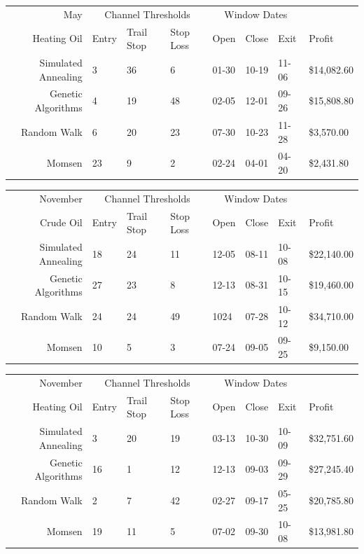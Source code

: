 \documentclass[12pt]{article}
\begin{document}
\begin{tabular}{|r|l|l|l|l|l|l|l|}
  \hline
  May & \multicolumn{3}{|c|}{Channel Thresholds} & \multicolumn{3}{|c|}{Window Dates} &  \\
  Heating Oil & Entry & Trail Stop & Stop Loss & Open & Close & Exit & Profit\\ \hline
  Simulated Annealing & 3 & 36 & 6 & 01-30 & 10-19 & 11-06 & \$14,082.60 \\ \hline
  Genetic Algorithms & 4 & 19 & 48 & 02-05 & 12-01 & 09-26 & \$15,808.80 \\ \hline
  Random Walk & 6 & 20 & 23 & 07-30 & 10-23 & 11-28 & \$3,570.00 \\ \hline
  Momsen & 23 & 9 & 2 & 02-24 & 04-01 & 04-20 & \$2,431.80 \\ \hline
\end{tabular}

\begin{tabular}{|r|l|l|l|l|l|l|l|}
  \hline
  November & \multicolumn{3}{|c|}{Channel Thresholds} & \multicolumn{3}{|c|}{Window Dates} &  \\
  Crude Oil & Entry & Trail Stop & Stop Loss & Open & Close & Exit & Profit\\ \hline
  Simulated Annealing & 18 & 24 & 11 & 12-05 & 08-11 & 10-08 & \$22,140.00 \\ \hline
  Genetic Algorithms & 27 & 23 & 8 & 12-13 & 08-31 & 10-15 & \$19,460.00 \\ \hline
  Random Walk & 24 & 24 & 49 & 1024 & 07-28 & 10-12 & \$34,710.00 \\ \hline
  Momsen & 10 & 5 & 3 & 07-24 & 09-05 & 09-25 & \$9,150.00 \\ \hline
\end{tabular}

\begin{tabular}{|r|l|l|l|l|l|l|l|}
  \hline
  November & \multicolumn{3}{|c|}{Channel Thresholds} & \multicolumn{3}{|c|}{Window Dates} &  \\
  Heating Oil & Entry & Trail Stop & Stop Loss & Open & Close & Exit & Profit\\ \hline
  Simulated Annealing & 3 & 20 & 19 & 03-13 & 10-30 & 10-09 & \$32,751.60 \\ \hline
  Genetic Algorithms & 16 & 1 & 12 & 12-13 & 09-03 & 09-29 & \$27,245.40 \\ \hline
  Random Walk & 2 & 7 & 42 & 02-27 & 09-17 & 05-25 & \$20,785.80 \\ \hline
  Momsen &  19 & 11 & 5 & 07-02 & 09-30 & 10-08 & \$13,981.80 \\ \hline
\end{tabular}
\end{document}
